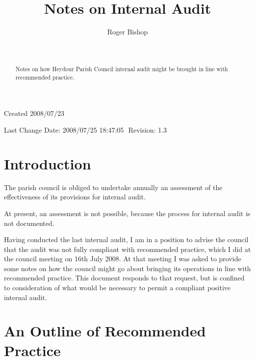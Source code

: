 \documentclass[numreferences]{rbjk}
\begin{document}
                                                                                   
\begin{article}
\begin{opening}  
\title{Notes on Internal Audit}
\author{Roger Bishop }
\date{$ $\ $ $}

\begin{abstract}
Notes on how Heydour Parish Council internal audit might be brought in line with recommended practice.
\end{abstract}

\end{opening}

\vfill

\begin{centering}
\footnotesize{
Created 2008/07/23

Last Change $ $Date: 2008/07/25 18:47:05 $ $ $ $Revision: 1.3 $ $

}%
\end{centering}

\setcounter{tocdepth}{4}
{\parskip-0pt\tableofcontents}

\section{Introduction}

The parish council is obliged to undertake annually an assessment of the effectiveness of its provisions for internal audit.

At present, an assessment is not possible, because the process for internal audit is not documented.

Having conducted the last internal audit, I am in a position to advise the council that the audit was not fully compliant with recommended practice, which I did at the council meeting on 16th July 2008.
At that meeting I was asked to provide some notes on how the council might go about bringing its operations in line with recommended practice.
This document responds to that request, but is confined to consideration of what would be necessary to permit a compliant positive internal audit.

\section{An Outline of Recommended Practice}


\end{article}
\end{document}

